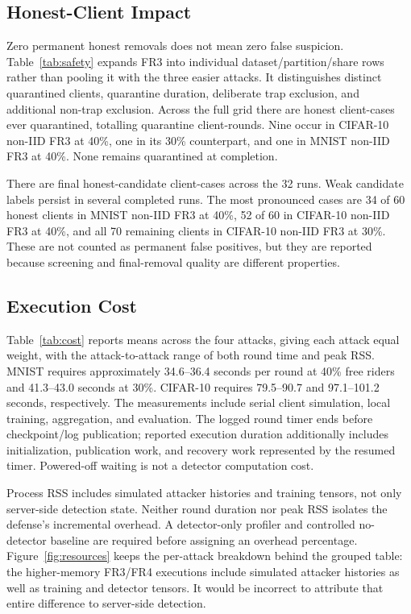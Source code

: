 \documentclass[conference]{IEEEtran}
\begin{document}
\subsection{Honest-Client Impact}
Zero permanent honest removals does not mean zero false suspicion.
Table~\ref{tab:safety} expands FR3 into individual dataset/partition/share
rows rather than pooling it with the three easier attacks. It distinguishes
distinct quarantined clients, quarantine duration, deliberate trap exclusion,
and additional non-trap exclusion. Across the full grid there are
\StudyQuarantined{} honest client-cases ever
quarantined, totalling \StudyQuarantineRounds{} quarantine client-rounds. Nine
occur in CIFAR-10 non-IID FR3 at 40\%, one in its 30\% counterpart, and one in
MNIST non-IID FR3 at 40\%. None remains quarantined at completion.

There are \StudyCandidates{} final honest-candidate client-cases across the
32 runs. Weak candidate labels persist in several completed runs. The most pronounced
cases are 34 of 60 honest clients in MNIST non-IID FR3 at 40\%, 52 of 60 in
CIFAR-10 non-IID FR3 at 40\%, and all 70 remaining clients in CIFAR-10 non-IID
FR3 at 30\%. These are not counted as permanent false positives, but they are
reported because screening and final-removal quality are different properties.


\subsection{Execution Cost}
Table~\ref{tab:cost} reports means across the four attacks, giving each attack
equal weight, with the attack-to-attack range of both round time and peak RSS.
MNIST requires approximately 34.6--36.4 seconds per round at 40\%
free riders and 41.3--43.0 seconds at 30\%. CIFAR-10 requires 79.5--90.7 and
97.1--101.2 seconds, respectively. The measurements include serial client
simulation, local training, aggregation, and evaluation. The logged round timer
ends before checkpoint/log publication; reported execution duration additionally
includes initialization, publication work, and recovery work represented by the
resumed timer. Powered-off waiting is not a detector computation cost.

Process RSS includes simulated attacker histories and training tensors, not
only server-side detection state. Neither round duration nor peak RSS isolates
the defense's incremental overhead. A detector-only profiler and controlled
no-detector baseline are required before assigning an overhead percentage.
Figure~\ref{fig:resources} keeps the per-attack breakdown behind the grouped
table: the higher-memory FR3/FR4 executions include simulated attacker histories
as well as training and detector tensors. It would be incorrect to attribute
that entire difference to server-side detection.


\end{document}
